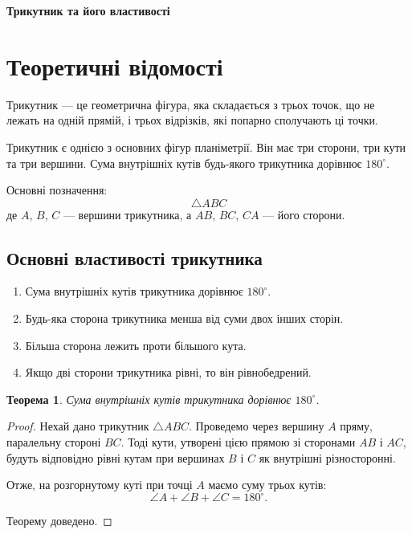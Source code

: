 \documentclass[12pt,a4paper]{article}
\newtheorem{theorem}{Теорема}
\begin{document}
\begin{center}
    {\LARGE \textbf{Трикутник та його властивості}}
\end{center}

\section*{Теоретичні відомості}

\begin{tcolorbox}[colback=blue!10!white, colframe=blue!60!black, title=Означення]
Трикутник --- це геометрична фігура, яка складається з трьох точок, що не лежать на одній прямій, і трьох відрізків, які попарно сполучають ці точки.
\end{tcolorbox}

Трикутник є однією з основних фігур планіметрії. Він має три сторони, три кути та три вершини. Сума внутрішніх кутів будь-якого трикутника дорівнює $180^\circ$.

Основні позначення:
\[
\triangle ABC
\]
де $A$, $B$, $C$ --- вершини трикутника, а $AB$, $BC$, $CA$ --- його сторони.

\subsection*{Основні властивості трикутника}

\begin{enumerate}
    \item Сума внутрішніх кутів трикутника дорівнює $180^\circ$.
    \item Будь-яка сторона трикутника менша від суми двох інших сторін.
    \item Більша сторона лежить проти більшого кута.
    \item Якщо дві сторони трикутника рівні, то він рівнобедрений.
\end{enumerate}

\begin{theorem}
Сума внутрішніх кутів трикутника дорівнює $180^\circ$.
\label{th:sum_angles}
\end{theorem}

\begin{proof}
Нехай дано трикутник $\triangle ABC$. Проведемо через вершину $A$ пряму, паралельну стороні $BC$. Тоді кути, утворені цією прямою зі сторонами $AB$ і $AC$, будуть відповідно рівні кутам при вершинах $B$ і $C$ як внутрішні різносторонні.

Отже, на розгорнутому куті при точці $A$ маємо суму трьох кутів:
\[
\angle A + \angle B + \angle C = 180^\circ.
\]

Теорему доведено.
\end{proof}
\end{document}
